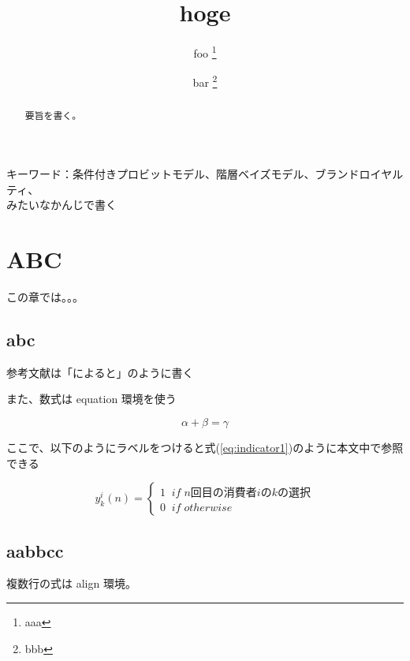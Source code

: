 \documentclass[11pt]{jsarticle}
\title{hoge}
\author{foo \thanks{aaa} \and bar \thanks{bbb}}
\begin{document}
\maketitle

 \thispagestyle{empty}

\begin{abstract}
要旨を書く。
\end{abstract}

\begin{center}
キーワード：条件付きプロビットモデル、階層ベイズモデル、ブランドロイヤルティ、\\ みたいなかんじで書く

\end{center}

\newpage

 \setcounter{page}{1}

\tableofcontents

\newpage
{}
 \setcounter{page}{1}



\section{ABC}
この章では。。。

\subsection{abc}
参考文献は「\citet{rosenbaum1983central}によると」のように書く

また、数式は equation 環境を使う

\begin{equation}
 \alpha + \beta = \gamma
\end{equation}

ここで、以下のようにラベルをつけると式(\ref{eq:indicator1})のように本文中で参照できる

\begin{equation} \label{eq:indicator1}
y_k^i(n) = \begin{cases}
             1 \;\; if \; \mbox{$n$回目の消費者$i$の$k$の選択}\\ %
             0 \;\; if \; otherwise
             \end{cases}
\end{equation}


\subsection{aabbcc}
複数行の式は align 環境。
\end{document}
